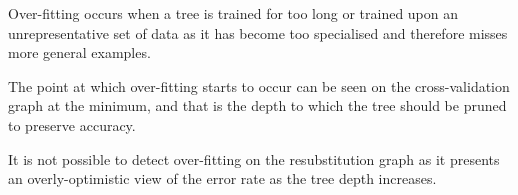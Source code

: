 \documentclass[a4paper]{article}
\begin{document}
Over-fitting occurs when a tree is trained for too long or trained upon an
unrepresentative set of data as it has become too specialised and therefore
misses more general examples.

The point at which over-fitting starts to occur can be seen on the
cross-validation graph at the minimum, and that is the depth to which the
tree should be pruned to preserve accuracy.

It is not possible to detect over-fitting on the resubstitution graph as it
presents an overly-optimistic view of the error rate as the tree depth
increases.

\begin{figure}[p]
  \centering
  \\

\end{figure}
\end{document}
